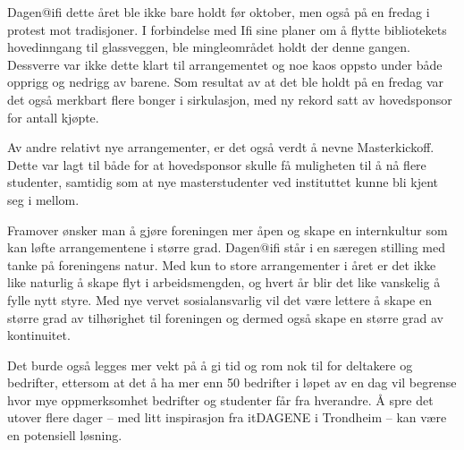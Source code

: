 Dagen@ifi dette året ble ikke bare holdt før oktober, men også på en fredag i protest mot tradisjoner. I forbindelse med Ifi sine planer om å flytte bibliotekets hovedinngang til glassveggen, ble mingleområdet holdt der denne gangen. Dessverre var ikke dette klart til arrangementet og noe kaos oppsto under både opprigg og nedrigg av barene. Som resultat av at det ble holdt på en fredag var det også merkbart flere bonger i sirkulasjon, med ny rekord satt av hovedsponsor for antall kjøpte.

Av andre relativt nye arrangementer, er det også verdt å nevne Masterkickoff. Dette var lagt til både for at hovedsponsor skulle få muligheten til å nå flere studenter, samtidig som at nye masterstudenter ved instituttet kunne bli kjent seg i mellom.

Framover ønsker man å gjøre foreningen mer åpen og skape en internkultur som kan løfte arrangementene i større grad. Dagen@ifi står i en særegen stilling med tanke på foreningens natur. Med kun to store arrangementer i året er det ikke like naturlig å skape flyt i arbeidsmengden, og hvert år blir det like vanskelig å fylle nytt styre. Med nye vervet sosialansvarlig vil det være lettere å skape en større grad av tilhørighet til foreningen og dermed også skape en større grad av kontinuitet.

Det burde også legges mer vekt på å gi tid og rom nok til for deltakere og bedrifter, ettersom at det å ha mer enn 50 bedrifter i løpet av en dag vil begrense hvor mye oppmerksomhet bedrifter og studenter får fra hverandre. Å spre det utover flere dager -- med litt inspirasjon fra itDAGENE i Trondheim -- kan være en potensiell løsning.
